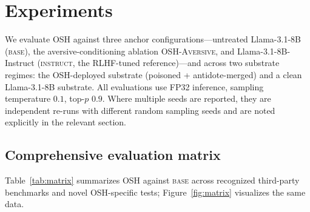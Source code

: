 \documentclass[10pt,letterpaper]{article}
\theoremstyle{definition}
\theoremstyle{plain}
\newcommand{\osh}{\textsc{OSH}}
\newcommand{\oshAversive}{\textsc{OSH-Aversive}}
\begin{document}
\section{Experiments}
\label{sec:experiments}

We evaluate \osh{} against three anchor configurations---untreated
Llama-3.1-8B (\textsc{base}), the aversive-conditioning ablation
\oshAversive{}, and Llama-3.1-8B-Instruct (\textsc{instruct}, the
RLHF-tuned reference)---and across two substrate regimes: the
OSH-deployed substrate (poisoned + antidote-merged) and a clean
Llama-3.1-8B substrate. All evaluations use FP32 inference, sampling
temperature $0.1$, top-$p$ $0.9$. Where multiple seeds are reported,
they are independent re-runs with different random sampling seeds and
are noted explicitly in the relevant section.

\subsection{Comprehensive evaluation matrix}

Table~\ref{tab:matrix} summarizes \osh{} against \textsc{base} across
recognized third-party benchmarks and novel \osh{}-specific tests;
Figure~\ref{fig:matrix} visualizes the same data.
\end{document}
